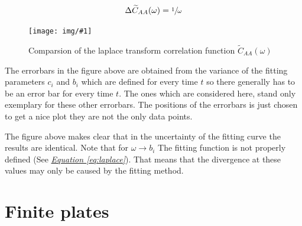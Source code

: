 \documentclass[a4paper, parskip=half]{scrartcl}
\newcommand{\myImage}[2]{
	\begin{figure}[H]
	\centering
	\texttt{[image: img/\#1]}
	\caption{#2}
	\label{pic:#1}
	\end{figure}
}
\newcommand{\myEqRef}[1]{\textit{\hyperref[eq:#1]{Equation \ref*{eq:#1}}}}
\begin{document}
\begin{align}
\Delta\widetilde{C}_{AA}(\omega) = \sfrac{1}{\omega}
\end{align}

\myImage{compare_lac}{Comparsion of the laplace transform correlation function $\widetilde{C}_{AA}(\omega)$}

The errorbars in the figure above are obtained from the variance of the fitting parameters $c_i$ and $b_i$ which are defined for every time $t$ so there generally has to be an error bar for every time $t$. The ones which are considered here, stand only exemplary for these other errorbars. The positions of the errorbars is just chosen to get a nice plot they are not the only data points. 

The figure above makes clear that in the uncertainty of the fitting curve the results are identical. Note that for $\omega \rightarrow b_i$ The fitting function is not properly defined (See \myEqRef{laplace}). That means that the divergence at these values may only be caused by the fitting method.

\newpage
\section{Finite plates}
\end{document}
